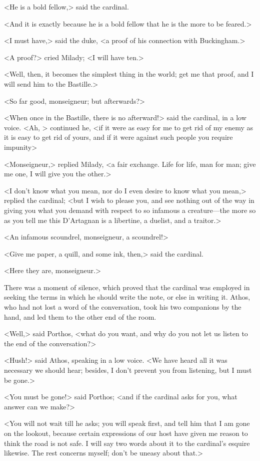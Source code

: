 <He is a bold fellow,> said the cardinal. 

<And it is exactly because he is a bold fellow that he is the more to be feared.> 

<I must have,> said the duke, <a proof of his connection with Buckingham.> 

<A proof?> cried Milady; <I will have ten.> 

<Well, then, it becomes the simplest thing in the world; get me that proof, and I will send him to the Bastille.> 

<So far good, monseigneur; but afterwards?> 

<When once in the Bastille, there is no afterward!> said the cardinal, in a low voice. <Ah, > continued he, <if it were as easy for me to get rid of my enemy as it is easy to get rid of yours, and if it were against such people you require impunity\longdash> 

<Monseigneur,> replied Milady, <a fair exchange. Life for life, man for man; give me one, I will give you the other.> 

<I don't know what you mean, nor do I even desire to know what you mean,> replied the cardinal; <but I wish to please you, and see nothing out of the way in giving you what you demand with respect to so infamous a creature—the more so as you tell me this D'Artagnan is a libertine, a duelist, and a traitor.> 

<An infamous scoundrel, monseigneur, a scoundrel!> 

<Give me paper, a quill, and some ink, then,> said the cardinal. 

<Here they are, monseigneur.> 

There was a moment of silence, which proved that the cardinal was employed in seeking the terms in which he should write the note, or else in writing it. Athos, who had not lost a word of the conversation, took his two companions by the hand, and led them to the other end of the room. 

<Well,> said Porthos, <what do you want, and why do you not let us listen to the end of the conversation?> 

<Hush!> said Athos, speaking in a low voice. <We have heard all it was necessary we should hear; besides, I don't prevent you from listening, but I must be gone.> 

<You must be gone!> said Porthos; <and if the cardinal asks for you, what answer can we make?> 

<You will not wait till he asks; you will speak first, and tell him that I am gone on the lookout, because certain expressions of our host have given me reason to think the road is not safe. I will say two words about it to the cardinal's esquire likewise. The rest concerns myself; don't be uneasy about that.> 

